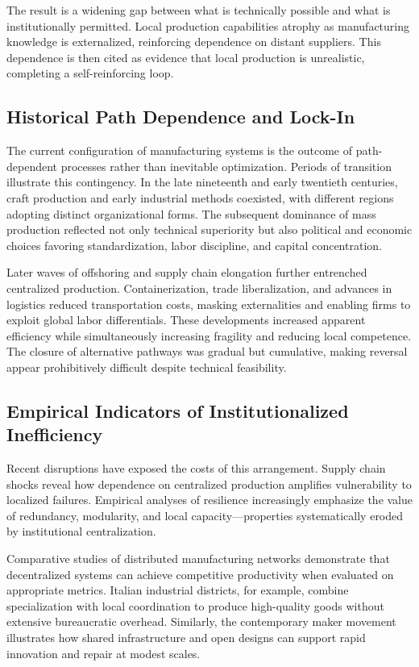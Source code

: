 \documentclass[11pt]{article}
\begin{document}
The result is a widening gap between what is technically possible and what is institutionally permitted. Local production capabilities atrophy as manufacturing knowledge is externalized, reinforcing dependence on distant suppliers. This dependence is then cited as evidence that local production is unrealistic, completing a self-reinforcing loop.

\subsection{Historical Path Dependence and Lock-In}

The current configuration of manufacturing systems is the outcome of path-dependent processes rather than inevitable optimization. Periods of transition illustrate this contingency. In the late nineteenth and early twentieth centuries, craft production and early industrial methods coexisted, with different regions adopting distinct organizational forms. The subsequent dominance of mass production reflected not only technical superiority but also political and economic choices favoring standardization, labor discipline, and capital concentration.

Later waves of offshoring and supply chain elongation further entrenched centralized production. Containerization, trade liberalization, and advances in logistics reduced transportation costs, masking externalities and enabling firms to exploit global labor differentials. These developments increased apparent efficiency while simultaneously increasing fragility and reducing local competence. The closure of alternative pathways was gradual but cumulative, making reversal appear prohibitively difficult despite technical feasibility.

\subsection{Empirical Indicators of Institutionalized Inefficiency}

Recent disruptions have exposed the costs of this arrangement. Supply chain shocks reveal how dependence on centralized production amplifies vulnerability to localized failures. Empirical analyses of resilience increasingly emphasize the value of redundancy, modularity, and local capacity—properties systematically eroded by institutional centralization.

Comparative studies of distributed manufacturing networks demonstrate that decentralized systems can achieve competitive productivity when evaluated on appropriate metrics. Italian industrial districts, for example, combine specialization with local coordination to produce high-quality goods without extensive bureaucratic overhead. Similarly, the contemporary maker movement illustrates how shared infrastructure and open designs can support rapid innovation and repair at modest scales.
\end{document}
